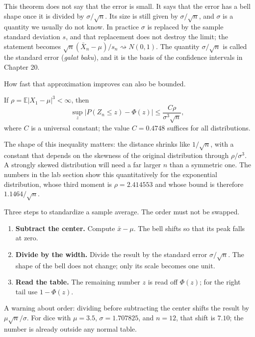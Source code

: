 This theorem does not say that the error is small. It says that the error has a bell
shape once it is divided by $\sigma/\sqrt n$. Its size is still given by
$\sigma/\sqrt n$, and $\sigma$ is a quantity we usually do not know. In practice
$\sigma$ is replaced by the sample standard deviation $s$, and that replacement does
not destroy the limit; the statement becomes $\sqrt n(\bar X_n-\mu)/s_n
\rightsquigarrow N(0,1)$. The quantity $\sigma/\sqrt n$ is called the standard error
 (\emph{galat baku}), and it is the basis of the confidence
intervals in Chapter 20.

How fast that approximation improves can also be bounded.

\begin{teorema}
If $\rho=\mathbb{E}|X_1-\mu|^3<\infty$, then
\[
\sup_z\bigl|P(Z_n\le z)-\Phi(z)\bigr|\le \frac{C\rho}{\sigma^3\sqrt n},
\]
where $C$ is a universal constant; the value $C=0.4748$ suffices for all
distributions.
\end{teorema}

The shape of this inequality matters: the distance shrinks like $1/\sqrt n$, with a
constant that depends on the skewness of the original distribution through
$\rho/\sigma^3$. A strongly skewed distribution will need a far larger $n$ than a
symmetric one. The numbers in the lab section show this quantitatively for the
exponential distribution, whose third moment is $\rho=2.414553$ and whose bound is
therefore $1.1464/\sqrt n$.

\begin{resep}
Three steps to standardize a sample average. The order must not be swapped.
\begin{enumerate}
\item \textbf{Subtract the center.} Compute $\bar x-\mu$. The bell shifts so that
      its peak falls at zero.
\item \textbf{Divide by the width.} Divide the result by the standard error
      $\sigma/\sqrt n$. The shape of the bell does not change; only its scale becomes
      one unit.
\item \textbf{Read the table.} The remaining number $z$ is read off $\Phi(z)$; for
      the right tail use $1-\Phi(z)$.
\end{enumerate}
A warning about order: dividing before subtracting the center shifts the result by
$\mu\sqrt n/\sigma$. For dice with $\mu=3.5$, $\sigma=1.707825$, and $n=12$,
that shift is $7.10$; the number is already outside any normal table.
\end{resep}

